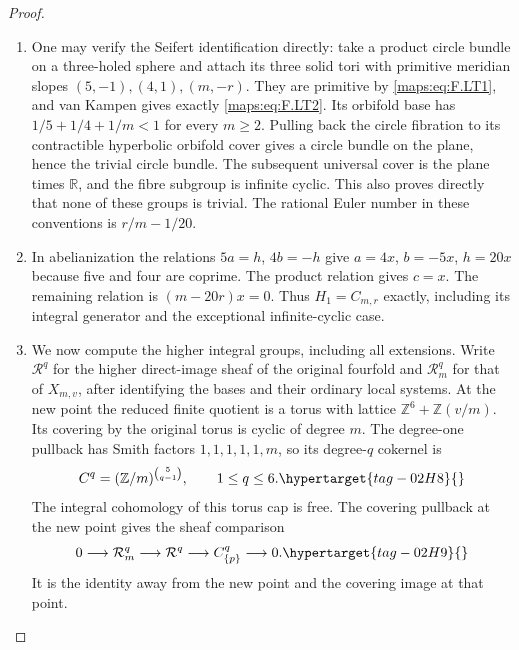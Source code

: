 \documentclass[11pt,a4paper]{article}
\numberwithin{equation}{section}
\theoremstyle{definition}
\begin{document}
\begin{proof}
\begin{enumerate}[label=\arabic*.]
\item One may verify the Seifert identification directly:
take a product circle bundle on a three-holed sphere
and attach its three solid tori with primitive meridian
slopes $(5,-1),(4,1),(m,-r)$.
They are primitive by \eqref{maps:eq:F.LT1}, and van Kampen gives
exactly \eqref{maps:eq:F.LT2}.
Its orbifold base has
$1/5+1/4+1/m<1$ for every $m\ge2$.
Pulling back the circle fibration to its contractible
hyperbolic orbifold cover gives a circle bundle on
the plane, hence the trivial circle bundle.
The subsequent universal cover is the plane times
$\mathbb R$, and the fibre subgroup is infinite cyclic.
This also proves directly that none of these groups
is trivial.
The rational Euler number in these conventions is
$r/m-1/20$.

\item In abelianization the relations $5a=h$, $4b=-h$
give $a=4x$, $b=-5x$, $h=20x$ because five and four
are coprime.
The product relation gives $c=x$.
The remaining relation is $(m-20r)x=0$.
Thus $H_1=C_{m,r}$ exactly, including its integral
generator and the exceptional infinite-cyclic case.

\item We now compute the higher integral groups, including
all extensions.
Write $\mathcal R^q$ for the higher direct-image
sheaf of the original fourfold and
$\mathcal R_m^q$ for that of $X_{m,v}$, after identifying
the bases and their ordinary local systems.
At the new point the reduced finite quotient is a
torus with lattice
$\mathbb Z^6+\mathbb Z(v/m)$.
Its covering by the original torus is cyclic of
degree $m$.
The degree-one pullback has Smith factors
$1,1,1,1,1,m$, so its degree-$q$ cokernel is
\begin{equation}
 C^q=(\mathbb Z/m)^{\binom5{q-1}},
 \qquad 1\le q\le6 .
\hypertarget{tag-02H8}{}\label{maps:eq:F.LT6}
\end{equation}
The integral cohomology of this torus cap is free.
The covering pullback at the new point gives the sheaf comparison
\begin{equation}
 0\longrightarrow\mathcal R_m^q
  \longrightarrow\mathcal R^q
  \longrightarrow C^q_{\{p\}}\longrightarrow0 .
\hypertarget{tag-02H9}{}\label{maps:eq:F.LT7}
\end{equation}
It is the identity away from the new point and the
covering image at that point.


\end{enumerate}
\end{proof}
\end{document}
